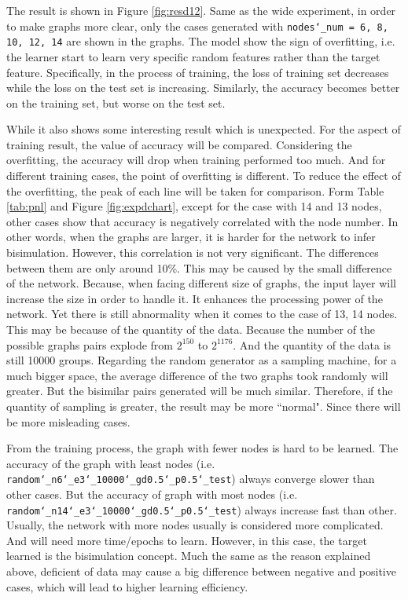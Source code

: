 The result is shown in Figure \ref{fig:resd12}.
Same as the wide experiment, in order to make graphs more clear, only the cases generated with \texttt{nodes\char`_num = 6, 8, 10, 12, 14} are shown in the graphs.
The model show the sign of overfitting, i.e. the learner start to learn very specific random features rather than the target feature.
Specifically, in the process of training, the loss of training set decreases while the loss on the test set is increasing.
Similarly, the accuracy becomes better on the training set, but worse on the test set.

While it also shows some interesting result which is unexpected.
For the aspect of training result, the value of accuracy will be compared.
Considering the overfitting, the accuracy will drop when training performed too much.
And for different training cases, the point of overfitting is different.
To reduce the effect of the overfitting, the peak of each line will be taken for comparison.
Form Table \ref{tab:pnl} and Figure \ref{fig:expdchart}, except for the case with 14 and 13 nodes, other cases show that accuracy is negatively correlated with the node number.
In other words, when the graphs are larger, it is harder for the network to infer bisimulation.
However, this correlation is not very significant. 
The differences between them are only around 10\%.
This may be caused by the small difference of the network.
Because, when facing different size of graphs, the input layer will increase the size in order to handle it.
It enhances the processing power of the network.
Yet there is still abnormality when it comes to the case of 13, 14 nodes.
This may be because of the quantity of the data.
Because the number of the possible graphs pairs explode from $2^150$ to $2^1176$.
And the quantity of the data is still 10000 groups.
Regarding the random generator as a sampling machine, for a much bigger space, the average difference of the two graphs took randomly will greater.
But the bisimilar pairs generated will be much similar.
Therefore, if the quantity of sampling is greater, the result may be more ``normal".
Since there will be more misleading cases.

From the training process, the graph with fewer nodes is hard to be learned.
The accuracy of the graph with least nodes (i.e. \texttt{random\char`_n6\char`_e3\char`_10000\char`_gd0.5\char`_p0.5\char`_test}) always converge slower than other cases.
But the accuracy of graph with most nodes (i.e. \texttt{random\char`_n14\char`_e3\char`_10000\char`_gd0.5\char`_p0.5\char`_test}) always increase fast than other.
Usually, the network with more nodes usually is considered more complicated.
And will need more time/epochs to learn.
However, in this case, the target learned is the bisimulation concept.
Much the same as the reason explained above, deficient of data may cause a big difference between negative and positive cases, which will lead to higher learning efficiency.

